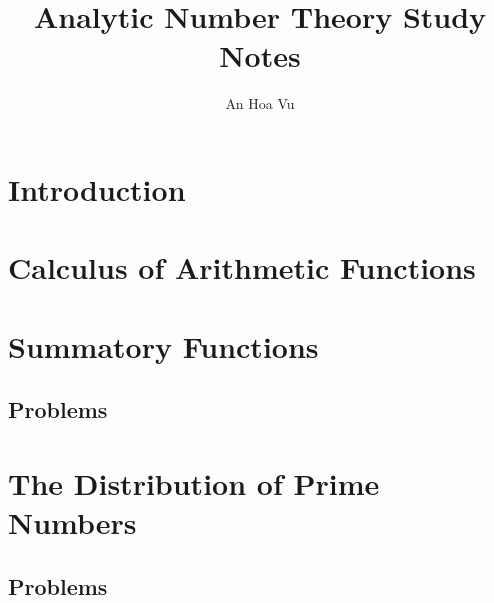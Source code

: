 \documentclass[12pt]{amsbook}
\title{Analytic Number Theory Study Notes}
\author{An Hoa Vu}
\begin{document}
\maketitle

\chapter{Introduction}



\chapter{Calculus of Arithmetic Functions}

\newcommand{\A}{\mathcal{A}}
\newcommand{\M}{\mathcal{M}}



\chapter{Summatory Functions}

\newcommand{\V}{\mathcal{V}}



\section{Problems}

















\chapter{The Distribution of Prime Numbers}

\newcommand{\val}[1]{\nu\left( #1 \right)}
\newcommand{\pval}[1]{\nu_p\left( #1 \right)}



\section{Problems}












\end{document}
